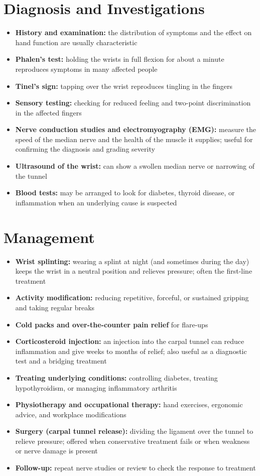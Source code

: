 \section*{Diagnosis and Investigations}
\begin{itemize}
    \item \textbf{History and examination:} the distribution of symptoms and the effect on hand function are usually characteristic
    \item \textbf{Phalen's test:} holding the wrists in full flexion for about a minute reproduces symptoms in many affected people
    \item \textbf{Tinel's sign:} tapping over the wrist reproduces tingling in the fingers
    \item \textbf{Sensory testing:} checking for reduced feeling and two-point discrimination in the affected fingers
    \item \textbf{Nerve conduction studies and electromyography (EMG):} measure the speed of the median nerve and the health of the muscle it supplies; useful for confirming the diagnosis and grading severity
    \item \textbf{Ultrasound of the wrist:} can show a swollen median nerve or narrowing of the tunnel
    \item \textbf{Blood tests:} may be arranged to look for diabetes, thyroid disease, or inflammation when an underlying cause is suspected
\end{itemize}

\section*{Management}
\begin{itemize}
    \item \textbf{Wrist splinting:} wearing a splint at night (and sometimes during the day) keeps the wrist in a neutral position and relieves pressure; often the first-line treatment
    \item \textbf{Activity modification:} reducing repetitive, forceful, or sustained gripping and taking regular breaks
    \item \textbf{Cold packs and over-the-counter pain relief} for flare-ups
    \item \textbf{Corticosteroid injection:} an injection into the carpal tunnel can reduce inflammation and give weeks to months of relief; also useful as a diagnostic test and a bridging treatment
    \item \textbf{Treating underlying conditions:} controlling diabetes, treating hypothyroidism, or managing inflammatory arthritis
    \item \textbf{Physiotherapy and occupational therapy:} hand exercises, ergonomic advice, and workplace modifications
    \item \textbf{Surgery (carpal tunnel release):} dividing the ligament over the tunnel to relieve pressure; offered when conservative treatment fails or when weakness or nerve damage is present
    \item \textbf{Follow-up:} repeat nerve studies or review to check the response to treatment
\end{itemize}

